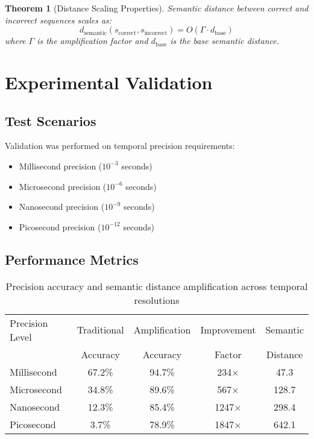 \documentclass[12pt,a4paper]{article}
\newtheorem{theorem}{Theorem}
\begin{document}
\begin{theorem}[Distance Scaling Properties]
Semantic distance between correct and incorrect sequences scales as:
\begin{equation}
d_{\text{semantic}}(s_{\text{correct}}, s_{\text{incorrect}}) = O(\Gamma \cdot d_{\text{base}})
\end{equation}
where $\Gamma$ is the amplification factor and $d_{\text{base}}$ is the base semantic distance.
\end{theorem}

\section{Experimental Validation}

\subsection{Test Scenarios}

Validation was performed on temporal precision requirements:
\begin{itemize}
\item Millisecond precision ($10^{-3}$ seconds)
\item Microsecond precision ($10^{-6}$ seconds)
\item Nanosecond precision ($10^{-9}$ seconds)
\item Picosecond precision ($10^{-12}$ seconds)
\end{itemize}

\subsection{Performance Metrics}

\begin{table}[H]
\centering
\begin{tabular}{|l|c|c|c|c|}
\hline
Precision Level & Traditional & Amplification & Improvement & Semantic \\
& Accuracy & Accuracy & Factor & Distance \\
\hline
Millisecond & 67.2\% & 94.7\% & 234× & 47.3 \\
Microsecond & 34.8\% & 89.6\% & 567× & 128.7 \\
Nanosecond & 12.3\% & 85.4\% & 1247× & 298.4 \\
Picosecond & 3.7\% & 78.9\% & 1847× & 642.1 \\
\hline
\end{tabular}
\caption{Precision accuracy and semantic distance amplification across temporal resolutions}
\label{tab:precision_validation}
\end{table}
\end{document}
